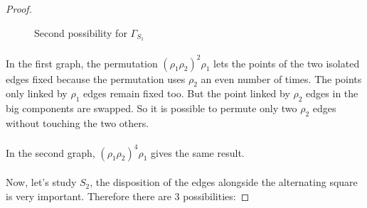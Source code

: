 \begin{proof}
  \begin{figure}[H]
    \begin{center}
      \caption{Second possibility for $\Gamma_{S_1}$}
    \end{center}
  \end{figure}

  \paragraph{}
  In the first graph, the permutation $(\rho_1 \rho_2)^2 \rho_1$ lets the points of the two isolated edges fixed because the permutation uses $\rho_2$ an even number of times. The points only linked by $\rho_1$ edges remain fixed too. But the point linked by $\rho_2$ edges in the big components are swapped. So it is possible to permute only two $\rho_2$ edges without touching the two others.

  \paragraph{}
  In the second graph, $(\rho_1\rho_2)^4 \rho_1$ gives the same result.

  \paragraph{}
  Now, let's study $S_2$, the disposition of the edges alongside the alternating square is very important. Therefore there are 3 possibilities:


\end{proof}

